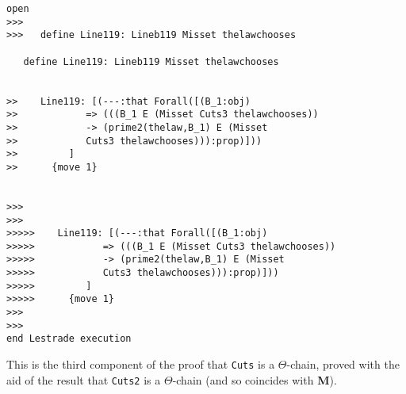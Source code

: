 \documentclass[12pt]{article}
\begin{document}
\begin{verbatim}
open
>>>
>>>   define Line119: Lineb119 Misset thelawchooses

   define Line119: Lineb119 Misset thelawchooses


>>    Line119: [(---:that Forall([(B_1:obj)
>>            => (((B_1 E (Misset Cuts3 thelawchooses))
>>            -> (prime2(thelaw,B_1) E (Misset
>>            Cuts3 thelawchooses))):prop)]))
>>         ]
>>      {move 1}


>>>
>>>
>>>>>    Line119: [(---:that Forall([(B_1:obj)
>>>>>            => (((B_1 E (Misset Cuts3 thelawchooses))
>>>>>            -> (prime2(thelaw,B_1) E (Misset
>>>>>            Cuts3 thelawchooses))):prop)]))
>>>>>         ]
>>>>>      {move 1}
>>>
>>>
end Lestrade execution
\end{verbatim}

This is the third component of the proof that {\tt Cuts} is a $\Theta$-chain, proved with the aid of the result that {\tt Cuts2} is a $\Theta$-chain (and so coincides with {\bf M}).
\end{document}
